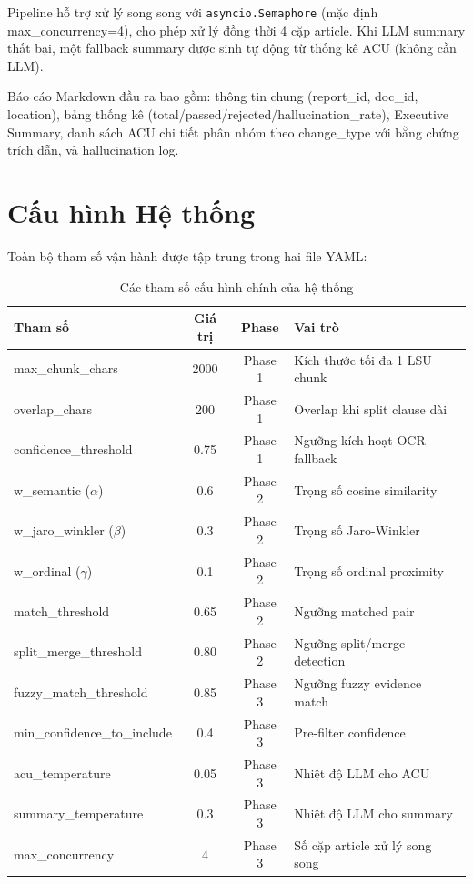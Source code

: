Pipeline hỗ trợ xử lý song song với \texttt{asyncio.Semaphore} (mặc định max\_concurrency=4), cho phép xử lý đồng thời 4 cặp article. Khi LLM summary thất bại, một fallback summary được sinh tự động từ thống kê ACU (không cần LLM).

Báo cáo Markdown đầu ra bao gồm: thông tin chung (report\_id, doc\_id, location), bảng thống kê (total/passed/rejected/hallucination\_rate), Executive Summary, danh sách ACU chi tiết phân nhóm theo change\_type với bằng chứng trích dẫn, và hallucination log.

\section{Cấu hình Hệ thống}

Toàn bộ tham số vận hành được tập trung trong hai file YAML:

\begin{table}[H]
    \centering
    \caption{Các tham số cấu hình chính của hệ thống}
    \label{tab:config_main}
    \begin{tabularx}{\textwidth}{X c c X}
        \toprule
        \textbf{Tham số} & \textbf{Giá trị} & \textbf{Phase} & \textbf{Vai trò}\\
        \midrule
        max\_chunk\_chars & 2000 & Phase 1 & Kích thước tối đa 1 LSU chunk\\
        overlap\_chars & 200 & Phase 1 & Overlap khi split clause dài\\
        confidence\_threshold & 0.75 & Phase 1 & Ngưỡng kích hoạt OCR fallback\\
        w\_semantic ($\alpha$) & 0.6 & Phase 2 & Trọng số cosine similarity\\
        w\_jaro\_winkler ($\beta$) & 0.3 & Phase 2 & Trọng số Jaro-Winkler\\
        w\_ordinal ($\gamma$) & 0.1 & Phase 2 & Trọng số ordinal proximity\\
        match\_threshold & 0.65 & Phase 2 & Ngưỡng matched pair\\
        split\_merge\_threshold & 0.80 & Phase 2 & Ngưỡng split/merge detection\\
        fuzzy\_match\_threshold & 0.85 & Phase 3 & Ngưỡng fuzzy evidence match\\
        min\_confidence\_to\_include & 0.4 & Phase 3 & Pre-filter confidence\\
        acu\_temperature & 0.05 & Phase 3 & Nhiệt độ LLM cho ACU\\
        summary\_temperature & 0.3 & Phase 3 & Nhiệt độ LLM cho summary\\
        max\_concurrency & 4 & Phase 3 & Số cặp article xử lý song song\\
        \bottomrule
    \end{tabularx}
\end{table}

